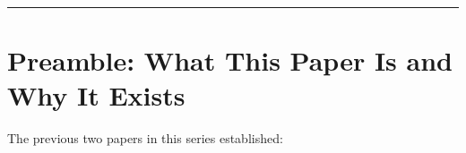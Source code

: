 \documentclass[12pt,a4paper]{article}
\newcommand{\prpc}{PrP$^{\mathrm{C}}$}
\newcommand{\Inet}[1]{$I_{#1}$}
\begin{document}
\begin{titlepage}
\begin{abstract}
The four couplings and their resolutions are derived precisely:
(1)~\Inet{1}~$\to$~cancer: telomere maintenance supplies the same telomerase
mechanism used by 90\% of cancers; resolved by sequencing \Inet{7} before
\Inet{1}; (2)~\Inet{4}~$\dashv$~\Inet{7}: chronic mTOR suppression degrades
immune surveillance; resolved by pulsed scheduling with \Inet{5} covering the
autophagy gap; (3)~\Inet{5}~$\dashv$~neuroprotection: \prpc{} substrate
reduction removes normal copper-binding and NMDA-modulating functions;
resolved at 50--60\% partial dosing plus \Inet{6} synergy, with permanent
dissolution via G127V base editing; (4)~\Inet{2}~$\to$~transition-zone
instability: Identity Anchor agonism in Hub-locked cells creates
transcriptional conflict; resolved by mandatory Hub inhibitor
co-administration.

Cross-species validation shows that natural selection independently produced
three viable solutions to this same topology. The equilibrium Waddington
landscape is defined as the state in which every major identity drift
pathway is covered with two-node redundancy and all antagonistic edges are
mitigated. Six novel claims are locked with timestamp 2026-03-09, each
assigned a named falsifying experiment.
\end{abstract}

\noindent\rule{\textwidth}{0.8pt}
\end{titlepage}

\tableofcontents
\newpage

\section{Preamble: What This Paper Is and Why It Exists}

The previous two papers in this series established:
\end{document}
